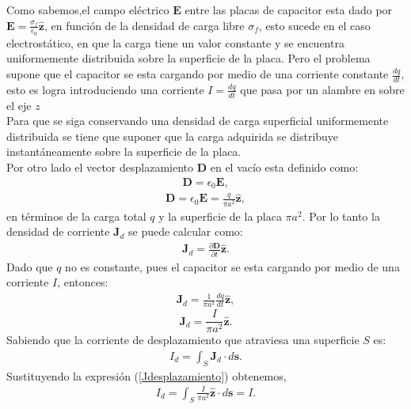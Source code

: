 \documentclass[11pt,fleqn]{book} %
\begin{document}
\begin{example}
Como sabemos,el campo el\'ectrico $\textbf{E}$ entre las placas de capacitor esta dado por $\textbf{E}=\frac{\sigma_{f}}{\epsilon_{0}}\hat{\textbf{z}}$, en funci\'on de la densidad de carga libre $\sigma_{f}$, esto sucede en el caso electrost\'atico, en que la carga tiene un valor constante y se encuentra uniformemente distribuida sobre la superficie de la placa. Pero el problema supone que el capacitor se esta cargando por medio de una corriente constante $\frac{dq}{dt}$, esto es logra introduciendo una corriente $I=\frac{dq}{dt}$ que pasa por un alambre en sobre el eje $z$\\
Para que se siga conservando una densidad de carga superficial uniformemente distribuida se tiene que suponer que la carga adquirida se distribuye instant\'aneamente sobre la superficie de la placa. \\
Por otro lado el vector desplazamiento $\textbf{D}$ en el vac\'io esta definido como:\\
\begin{eqnarray*}
\textbf{D}=\epsilon_{0} \textbf{E},
\end{eqnarray*}
\begin{eqnarray*}
\textbf{D}=\epsilon_{0} \textbf{E}=\frac{q}{\pi a^{2} }\hat{\textbf{z}},
\end{eqnarray*}
en t\'erminos de la carga total $q$ y la superficie de la placa $\pi a^{2}$. Por lo tanto la densidad de corriente $\textbf{J}_{d}$ se puede calcular como:
\begin{eqnarray*}
\textbf{J}_{d}=\frac{\partial \textbf{D}}{\partial t} \hat{\textbf{z}}.
\end{eqnarray*}
Dado que $q$ no es constante, pues el capacitor se esta cargando por medio de una corriente $I$, entonces:\\
\begin{eqnarray*}
\textbf{J}_{d}=\frac{1}{\pi a^{2}}\frac{dq}{dt} \hat{\textbf{z}},
\end{eqnarray*}
\begin{equation}
\textbf{J}_{d}=\frac{I}{\pi a^{2}} \hat{\textbf{z}}. \label{Jdesplazamiento}
\end{equation}
Sabiendo que la corriente de desplazamiento que atraviesa una superficie $S$ es:
\begin{eqnarray*}
I_{d}=\int_{S} \textbf{J}_{d} \cdot d\textbf{s}.
\end{eqnarray*}
Sustituyendo la expresi\'on (\ref{Jdesplazamiento}) obtenemos,
\begin{eqnarray*}
I_{d}=\int_{S} \frac{I}{\pi a^{2}} \hat{\textbf{z}} \cdot d\textbf{s}=I.

\end{eqnarray*}
\end{example}
\end{document}
